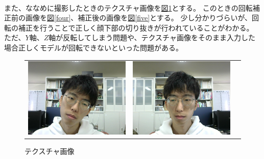 \documentclass[]{jarticle}          %
\begin{document}
\\
また、ななめに撮影したときのテクスチャ画像を\hyperref[three]{図\ref{three}}とする。
このときの回転補正前の画像を\hyperref[four]{図\ref{four}}、補正後の画像を\hyperref[five]{図\ref{five}}とする。
少し分かりづらいが、回転の補正を行うことで正しく顔下部の切り抜きが行われていることがわかる。
ただ、$Y$軸、$Z$軸が反転してしまう問題や、テクスチャ画像をそのまま入力した場合正しくモデルが回転できないといった問題がある。
\begin{figure}[!ht]
  \begin{tabular}{ccc}
    \begin{minipage}[t]{0.3\hsize}
      \centering
      \includegraphics[keepaspectratio, scale=0.2]{figures/texture.jpg}
      \caption{テクスチャ画像}
      \label{three}
    \end{minipage} &
    \begin{minipage}[t]{0.3\hsize}
      \centering
      \includegraphics[keepaspectratio, scale=0.2]{figures/3.png}

\end{minipage}
\end{tabular}
\end{figure}
\end{document}
